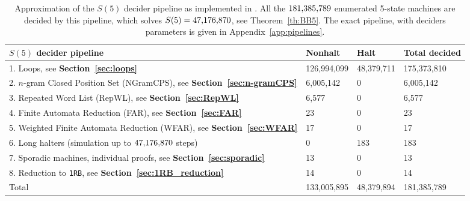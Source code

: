 \begin{table}[h!]
    \centering
    \begin{tabular}{|l|lll|}
        \hline
        $S(5)$ decider pipeline                                                              & Nonhalt                         & Halt                           & Total decided \\
        \hline
        1. Loops, see \textbf{Section~\ref{sec:loops}}                                       & 126,994,099                     & 48,379,711                     & 175,373,810   \\
        2. $n$-gram Closed Position Set (NGramCPS), see \textbf{Section~\ref{sec:n-gramCPS}} & 6,005,142                       & 0                              & 6,005,142     \\
        3. Repeated Word List (RepWL), see \textbf{Section~\ref{sec:RepWL}}                  & 6,577                           & 0                              & 6,577         \\
        4. Finite Automata Reduction (FAR), see \textbf{Section~\ref{sec:FAR}}               & 23                              & 0                              & 23            \\
        5. Weighted Finite Automata Reduction (WFAR), see \textbf{Section~\ref{sec:WFAR}}    & 17                              & 0                              & 17            \\
        6. Long halters (simulation up to $47{,}176{,}870$ steps)                               & 0                               & 183                            & 183           \\
        7. Sporadic machines, individual proofs, see \textbf{Section~\ref{sec:sporadic}}     & 13                              & 0                              & 13            \\
        8. Reduction to \texttt{1RB}, see \textbf{Section~\ref{sec:1RB_reduction}}           & 14                              & 0                              & 14            \\ \hline
        Total                                                                                & \multicolumn{1}{r}{133,005,895} & \multicolumn{1}{r}{48,379,894} & 181,385,789   \\ \hline
    \end{tabular}
    \caption{Approximation of the $S(5)$ decider pipeline as implemented in \CoqBB. All the $181{,}385{,}789$ enumerated 5-state machines are decided by this pipeline, which solves $S(5) = 47{,}176{,}870$, see Theorem~\ref{th:BB5}. The exact pipeline, with deciders parameters is given in Appendix~\ref{app:pipelines}. }\label{tab:pipelineBB5}
\end{table}

